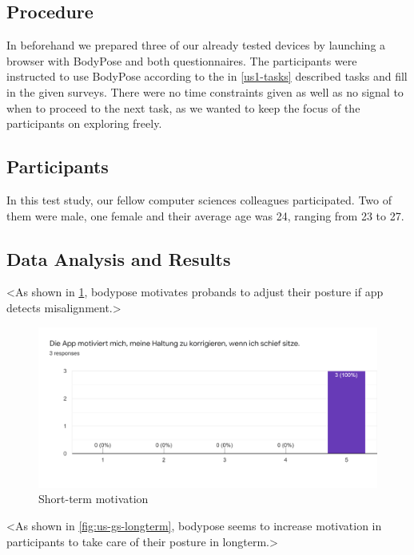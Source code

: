 \subsection{Procedure}
\label{us1-procedure}
In beforehand we prepared three of our already tested devices by launching a browser with BodyPose and both questionnaires.
The participants were instructed to use BodyPose according to the in \ref{us1-tasks} described tasks and fill in the given surveys. There were no time constraints given as well as no signal to when to proceed to the next task, as we wanted to keep the focus of the participants on exploring freely.
  

\subsection{Participants}
\label{us1-participants}
In this test study, our fellow computer sciences colleagues participated. Two of them were male, one female and their average age was 24, ranging from 23 to 27.


\subsection{Data Analysis and Results} %
\label{us1-data-analysis-results}
<As shown in \ref{fig:us-gs-shortterm}, bodypose motivates probands to adjust their posture if app detects misalignment.> 

\begin{figure}[hbp]
\centering
\includegraphics[width=\linewidth]{media/us-gs-shortterm-motivation-results.png}    
\caption{Short-term motivation}
\label{fig:us-gs-shortterm}
\end{figure}

<As shown in \ref{fig:us-gs-longterm}, bodypose seems to increase motivation in participants to take care of their posture in longterm.>

